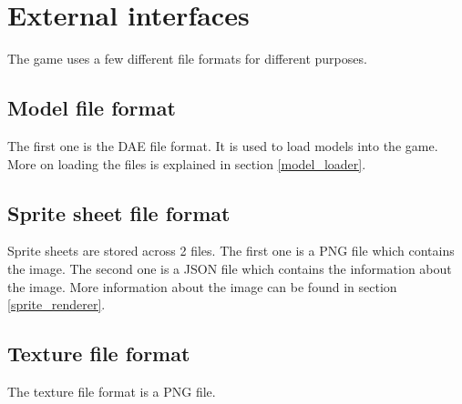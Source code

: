 \section{External interfaces}

The game uses a few different file formats for different purposes.

\subsection{Model file format}
The first one is the DAE file format.
It is used to load models into the game.
More on loading the files is explained in section \ref{model_loader}.

\subsection{Sprite sheet file format}
Sprite sheets are stored across 2 files.
The first one is a PNG file which contains the image.
The second one is a JSON file which contains the information about the image.
More information about the image can be found in section \ref{sprite_renderer}.

\subsection{Texture file format}
The texture file format is a PNG file.